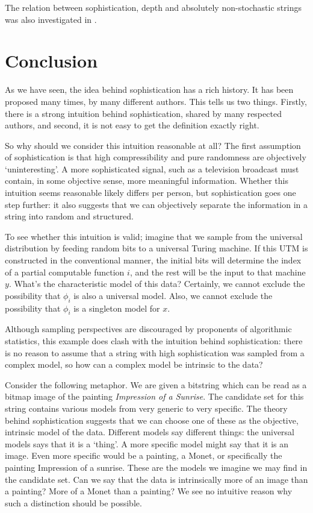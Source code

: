 \documentclass{style/llncs}
\begin{document}
The relation between sophistication, depth and absolutely non-stochastic strings was also investigated in \cite{antunes2013sophistication}.

\section{Conclusion}
\label{section:conclusion}
As we have seen, the idea behind sophistication has a rich history. It has been proposed many times, by many different authors. This tells us two things. Firstly, there is a strong intuition behind sophistication, shared by many respected authors, and second, it is not easy to get the definition exactly right.

So why should we consider this intuition reasonable at all? The first assumption of sophistication is that high compressibility and pure randomness are objectively `uninteresting'. A more sophisticated signal, such as a television broadcast must contain, in some objective sense, more meaningful information. Whether this intuition seems reasonable likely differs per person, but sophistication goes one step further: it also suggests that we can objectively separate the information in a string into random and structured.

To see whether this intuition is valid; imagine that we sample from the universal distribution by feeding random bits to a universal Turing machine. If this UTM is constructed in the conventional manner, the initial bits will determine the index of a partial computable function $i$, and the rest will be the input to that machine $y$. What's the characteristic model of this data? Certainly, we cannot exclude the possibility that $\phi_i$ is also a universal model. Also, we cannot exclude the possibility that $\phi_i$ is a singleton model for $x$.

Although sampling perspectives are discouraged by proponents of algorithmic statistics, this example does clash with the intuition behind sophistication: there is no reason to assume that a string with high sophistication was sampled from a complex model, so how can a complex model be intrinsic to the data? \footnotemark


Consider the following metaphor. We are given a bitstring which can be read as a bitmap image of the painting \emph{Impression of a Sunrise}. The candidate set for this string contains various models from very generic to very specific. The theory behind sophistication suggests that we can choose one of these as the objective, intrinsic model of the data. Different models say different things: the universal models says that it is a `thing'. A more specific model might say that it is an image. Even more specific would be a painting, a Monet, or specifically the painting Impression of a sunrise. These are the models we imagine we may find in the candidate set. Can we say that the data is intrinsically more of an image than a painting? More of a Monet than a painting? We see no intuitive reason why such a distinction should be possible.    
\end{document}

